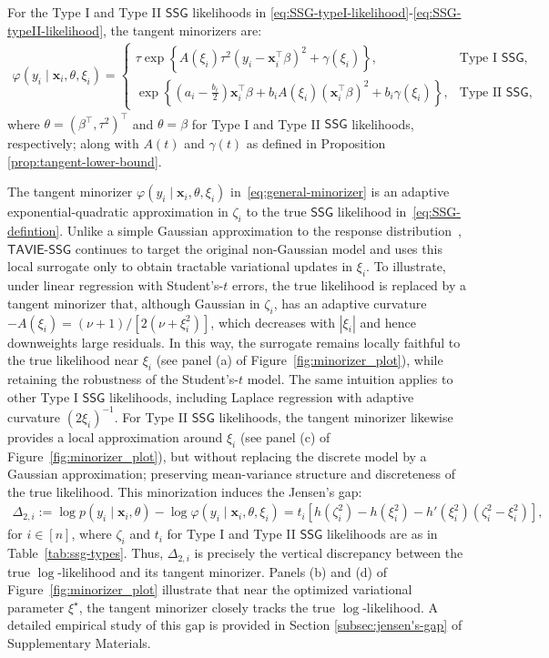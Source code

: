 \documentclass[12pt]{article}
\numberwithin{equation}{section}
\newcommand{\ssg}{\mathsf{SSG}}
\newcommand{\tssg}{\mathsf{TAVIE}\text{-}\mathsf{SSG}}
\begin{document}
For the Type I and Type II $\ssg$ likelihoods in \eqref{eq:SSG-typeI-likelihood}-\eqref{eq:SSG-typeII-likelihood}, the tangent minorizers are:
\begin{align}\label{eq:minorizers-type-I-II}
    \varphi(y_i \mid \mathbf{x}_i, \theta, \xi_i) = \begin{cases}
        \tau \exp\left\{A(\xi_i)\tau^2(y_i - \mathbf{x}_i^{\top}\beta)^2 + \gamma(\xi_i)\right\}, & \text{Type I $\ssg$},\\
        \exp\left\{\left(a_i-\frac{b_i}{2}\right)\mathbf{x}_i^{\top}\beta + b_i A(\xi_i)(\mathbf{x}_i^{\top}\beta)^2 + b_i\gamma(\xi_i)\right\}, & \text{Type II $\ssg$},
    \end{cases}
\end{align}
% 
where $\theta = (\beta^{\top}, \tau^2)^{\top}$ and $\theta = \beta$ for Type I and Type II $\ssg$ likelihoods, respectively; along with $A(t)$ and $\gamma(t)$ as defined in Proposition \ref{prop:tangent-lower-bound}.

The tangent minorizer $\varphi(y_i\mid \mathbf x_i, \theta, \xi_i)$ in~\eqref{eq:general-minorizer} is an adaptive exponential-quadratic approximation in $\zeta_i$ to the true $\ssg$ likelihood in~\eqref{eq:SSG-defintion}. Unlike a simple Gaussian approximation to the response distribution~\citep{breslow1993approximate}, $\tssg$ continues to target the original non-Gaussian model and uses this local surrogate only to obtain tractable variational updates in $\xi_i$. To illustrate, under linear regression with Student's-$t$ errors, the true likelihood is replaced by a tangent minorizer that, although Gaussian in $\zeta_i$, has an adaptive curvature $-A(\xi_i) = (\nu+1)/[2(\nu+\xi_i^2)]$, which decreases with $|\xi_i|$ and hence downweights large residuals. In this way, the surrogate remains locally faithful to the true likelihood near $\xi_i$ (see panel (a) of Figure~\ref{fig:minorizer_plot}), while retaining the robustness of the Student's-$t$ model. The same intuition applies to other Type I $\ssg$ likelihoods, including Laplace regression with adaptive curvature $(2\xi_i)^{-1}$. For Type II $\ssg$ likelihoods, the tangent minorizer likewise provides a local approximation around $\xi_i$ (see panel (c) of Figure~\ref{fig:minorizer_plot}), but without replacing the discrete model by a Gaussian approximation; preserving mean-variance structure and discreteness of the true likelihood. This minorization induces the Jensen's gap:
\begin{align}
\label{eq:jensen's-gap}
\Delta_{2, i} := \log p(y_{i}\mid \mathbf{x}_i, \theta) - \log \varphi(y_i \mid \mathbf{x}_i, \theta, \xi_i) = t_i[h(\zeta_i^2) - h(\xi_i^{2}) - h'(\xi_i^2)(\zeta_i^2 - \xi_i^2)],
\end{align}
for $i\in [n]$, where $\zeta_i$ and $t_i$ for Type I and Type II $\ssg$ likelihoods are as in Table~\ref{tab:ssg-types}. Thus, $\Delta_{2, i}$ is precisely the vertical discrepancy between the true $\log$-likelihood and its tangent minorizer. Panels (b) and (d) of Figure~\ref{fig:minorizer_plot} illustrate that near the optimized variational parameter $\xi^{\star}$, the tangent minorizer closely tracks the true $\log$-likelihood. A detailed empirical study of this gap is provided in Section \ref{subsec:jensen's-gap} of Supplementary Materials. 
\end{document}
